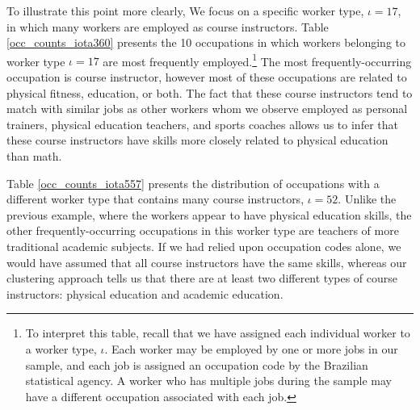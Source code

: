 \documentclass[12pt]{article}
\def\i{\iota}
\theoremstyle{definition}
\theoremstyle{plain}
\begin{document}

To illustrate this point more clearly, We focus on a specific worker type, $\i=17$, in which many workers are employed as course instructors. Table \ref{occ_counts_iota360} presents the 10 occupations in which workers belonging to worker type $\i=17$ are most frequently employed.\footnote{To interpret this table, recall that we have assigned each individual worker to a worker type, $\i$. Each worker may be employed by one or more jobs in our sample, and each job is assigned an occupation code by the Brazilian statistical agency. A worker who has multiple jobs during the sample may have a different occupation associated with each job.}  The most frequently-occurring occupation is course instructor, however most of these occupations are related to physical fitness, education, or both. The fact that these course instructors tend to match with similar jobs as other workers whom we observe employed as personal trainers, physical education teachers, and sports coaches allows us to infer that these course instructors have skills more closely related to physical education than math. 

Table \ref{occ_counts_iota557} presents the distribution of occupations with a different worker type that contains many course instructors, $\i=52$. Unlike the previous example, where the workers appear to have physical education skills, the other frequently-occurring occupations in this worker type are teachers of more traditional academic subjects. If we had relied upon occupation codes alone, we would have assumed that all course instructors have the same skills, whereas our clustering approach tells us that there are at least two different types of course instructors: physical education and academic education.
\end{document}
